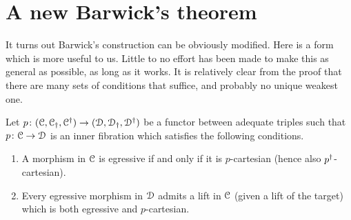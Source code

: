 \documentclass[main.tex]{subfiles}
\begin{document}
\section{A new Barwick's theorem}
\label{sec:a_new_barwick_s_theorem}

It turns out Barwick's construction can be obviously modified. Here is a form which is more useful to us. Little to no effort has been made to make this as general as possible, as long as it works. It is relatively clear from the proof that there are many sets of conditions that suffice, and probably no unique weakest one.

\begin{theorem}
  Let $p\colon (\mathcal{C}, \mathcal{C}_{\dagger}, \mathcal{C}^{\dagger}) \to (\mathcal{D}, \mathcal{D}_{\dagger}, \mathcal{D}^{\dagger})$ be a functor between adequate triples such that $p\colon \mathcal{C} \to \mathcal{D}$ is an inner fibration which satisfies the following conditions.
  \begin{enumerate}
    \item A morphism in $\mathcal{C}$ is egressive if and only if it is $p$-cartesian (hence also $p^{\dagger}$-cartesian).

    \item Every egressive morphism in $\mathcal{D}$ admits a lift in $\mathcal{C}$ (given a lift of the target) which is both egressive and $p$-cartesian.


\end{enumerate}
\end{theorem}
\end{document}
